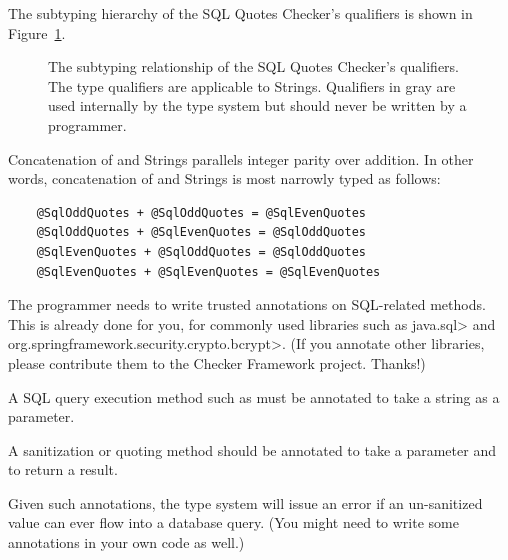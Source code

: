 The subtyping hierarchy of the SQL Quotes Checker's qualifiers is shown in
Figure~\ref{fig-sql-quotes-hierarchy}.

\begin{figure}
\caption{The subtyping relationship of the SQL Quotes Checker's qualifiers.
  The type qualifiers are applicable to Strings. Qualifiers in gray are
  used internally by the type system but should never be written by a programmer.}
\label{fig-sql-quotes-hierarchy}
\end{figure}



Concatenation of  and  Strings parallels
integer parity over addition. In other words, concatenation of 
and  Strings is most narrowly typed as follows:

\begin{Verbatim}
    @SqlOddQuotes + @SqlOddQuotes = @SqlEvenQuotes
    @SqlOddQuotes + @SqlEvenQuotes = @SqlOddQuotes
    @SqlEvenQuotes + @SqlOddQuotes = @SqlOddQuotes
    @SqlEvenQuotes + @SqlEvenQuotes = @SqlEvenQuotes
\end{Verbatim}



The programmer needs to write trusted annotations on SQL-related methods.
This is already done for you, for commonly used libraries such as
\<java.sql> and
\<org.springframework.security.crypto.bcrypt>.
(If you annotate other libraries, please contribute them to the Checker
Framework project.  Thanks!)

A SQL query execution method such as  must be
annotated to take a  string as a parameter.

A sanitization or quoting method should be annotated to take a
 parameter and to
return a  result.

Given such annotations, the type system will issue an error if an
un-sanitized value can ever flow into a database query.
(You might need to write some annotations in your own code as well.)

